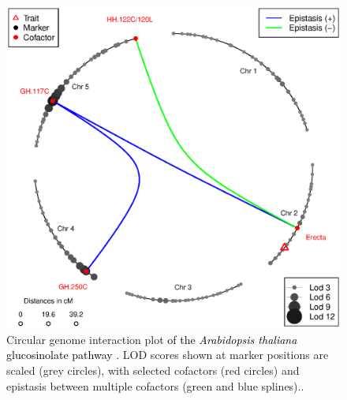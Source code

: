 \begin{figure}[h!]
  \centering
  \includegraphics[keepaspectratio,scale=0.30]{eps/image_3_1.eps}
  \caption[Circle plot.]{Circular genome interaction plot \textcolor{black}{of the {\it Arabidopsis 
        thaliana} glucosinolate pathway} \citep{Fu:2007}.  LOD scores shown at marker positions 
        are scaled (grey circles), with selected cofactors (red circles) and epistasis between 
        multiple cofactors (green and blue splines)..}
  \label{fig:circleplot}
\end{figure}

